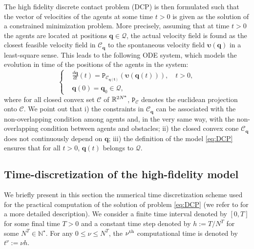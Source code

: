  The high fidelity discrete contact problem (DCP) is then formulated such that the vector of velocities of the agents at some time $t>0$ is given as the solution of a constrained minimization problem. More precisely, assuming that at time $t>0$ the agents are located at positions $\mathbf{q}\in \mathcal Q$, the actual velocity field is found as the closest feasible velocity field in $\mathcal C_{\mathbf{q}}$ to the spontaneous velocity field $\boldsymbol{\upsilon}(\mathbf{q})$ in a least-square sense. This leads to the following ODE system, which models the evolution in time of the positions of the agents in the system:
 \begin{equation}
		\begin{cases}
			&\frac{d\mathbf{q}}{dt}(t)=\texttt{P}_{\mathcal{C}_{\mathbf{q(t)}}}(\boldsymbol{\upsilon}(\mathbf{q}(t))), \quad t>0,\\
			&\mathbf{q}(0)=\mathbf{q}_0 \in \mathcal{Q},
		\end{cases}
  \label{eq:DCP}
	\end{equation}
where for all closed convex set $\mathcal C$ of $\mathbb{R}^{2N^{\rm a}}$, $\texttt{P}_{\mathcal{C}}$ denotes the euclidean projection onto $\mathcal{C}$. We point out that i) the constraints in $\mathcal{C}_{\mathbf{q}}$ can be associated with the non-overlapping condition among agents and, in the very same way, with the non-overlapping condition between agents and obstacles; ii) the closed convex cone $\mathcal{C}_{\mathbf{q}}$ does not continuously depend on $\mathbf{q}$; iii) the definition of the model \eqref{eq:DCP} ensures that for all $t>0$, $\mathbf{q}(t)$ belongs to $\mathcal Q$.\\

\subsection{Time-discretization of the high-fidelity model}
\label{sec:FOM}
We briefly present in this section the numerical time discretization scheme used for the practical computation of the solution of problem \eqref{eq:DCP} (we refer to \cite{maury2011discrete} for a more detailed description).
We consider a finite time interval denoted by $[0,T]$ for some final time $T>0$ and a constant time step denoted by $h:=T/N^T$ for some $N^T \in \mathbb{N}^{\star}$. For any $0\leq \nu \leq N^T$, the $\nu^{\rm th}$ computational time is denoted by $t^{\nu}:=\nu h$. 

\medskip

